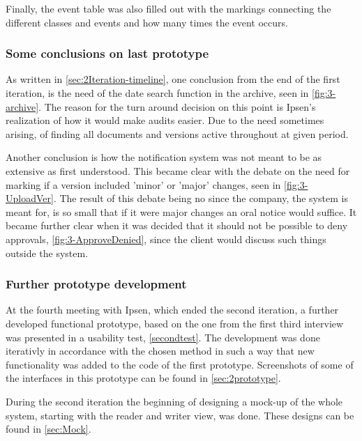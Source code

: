 Finally, the event table was also filled out with the markings connecting the different classes and events and how many times the event occurs.

\subsubsection*{Some conclusions on last prototype}
As written in \cref{sec:2Iteration-timeline}, one conclusion from the end of the first iteration, is the need of the date search function in the archive, seen in \cref{fig:3-archive}.
The reason for the turn around decision on this point is Ipsen's realization of how it would make audits easier.
Due to the need sometimes arising, of finding all documents and versions active throughout at given period.

Another conclusion is how the notification system was not meant to be as extensive as first understood. 
This became clear with the debate on the need for marking if a version included 'minor' or 'major' changes, seen in \cref{fig:3-UploadVer}.
The result of this debate being no since the company, the system is meant for, is so small that if it were major changes an oral notice would suffice.
It became further clear when it was decided that it should not be possible to deny approvals, \cref{fig:3-ApproveDenied}, since the client would discuss such things outside the system.

\subsubsection*{Further prototype development}
At the fourth meeting with Ipsen, which ended the second iteration, a further developed functional prototype, based on the one from the first third interview was presented in a usability test, \cref{secondtest}.
The development was done iterativly in accordance with the chosen method in such a way that new functionality was added to the code of the first prototype.
Screenshots of some of the interfaces in this prototype can be found in \cref{sec:2prototype}.

During the second iteration the beginning of designing a mock-up of the whole system, starting with the reader and writer view, was done. 
These designs can be found in \cref{sec:Mock}.
